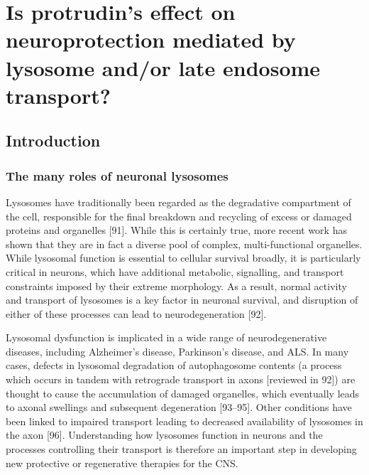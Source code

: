 \documentclass[
  12pt,
  a4paper,
]{book}
\renewcommand{\chaptermark}[1]{\markboth{#1}{}}
\begin{document}
\chapter{Is protrudin's effect on neuroprotection mediated by lysosome and/or late endosome transport?}\label{is-protrudins-effect-on-neuroprotection-mediated-by-lysosome-andor-late-endosome-transport}

\chaptermark{Lysosome and late endosome transport}

\section{Introduction}\label{introduction}

\subsection{The many roles of neuronal lysosomes}\label{the-many-roles-of-neuronal-lysosomes}

Lysosomes have traditionally been regarded as the degradative compartment of the cell, responsible for the final breakdown and recycling of excess or damaged proteins and organelles {[}91{]}. While this is certainly true, more recent work has shown that they are in fact a diverse pool of complex, multi-functional organelles. While lysosomal function is essential to cellular survival broadly, it is particularly critical in neurons, which have additional metabolic, signalling, and transport constraints imposed by their extreme morphology. As a result, normal activity and transport of lysosomes is a key factor in neuronal survival, and disruption of either of these processes can lead to neurodegeneration {[}92{]}.

Lysosomal dysfunction is implicated in a wide range of neurodegenerative diseases, including Alzheimer's disease, Parkinson's disease, and ALS. In many cases, defects in lysosomal degradation of autophagosome contents (a process which occurs in tandem with retrograde transport in axons {[}reviewed in 92{]}) are thought to cause the accumulation of damaged organelles, which eventually leads to axonal swellings and subsequent degeneration {[}93--95{]}. Other conditions have been linked to impaired transport leading to decreased availability of lysosomes in the axon {[}96{]}. Understanding how lysosomes function in neurons and the processes controlling their transport is therefore an important step in developing new protective or regenerative therapies for the CNS.
\end{document}
